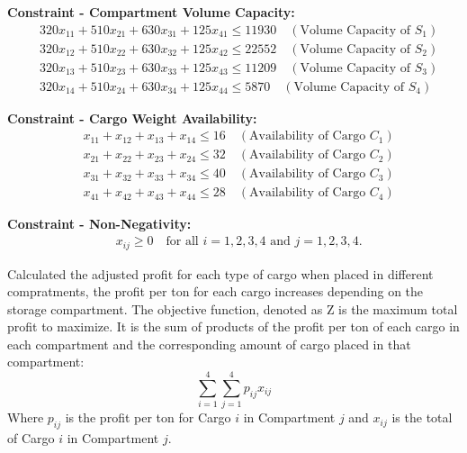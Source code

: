 \documentclass[unicode,11pt,a4paper,oneside,numbers=endperiod,openany]{scrartcl}
\begin{document}
\textbf{Constraint - Compartment Volume Capacity:}
\[
\begin{aligned}
& 320x_{11} + 510x_{21} + 630x_{31} + 125x_{41} \leq 11930 \quad (\text{Volume Capacity of } S_1) \\
& 320x_{12} + 510x_{22} + 630x_{32} + 125x_{42} \leq 22552 \quad (\text{Volume Capacity of } S_2) \\
& 320x_{13} + 510x_{23} + 630x_{33} + 125x_{43} \leq 11209 \quad (\text{Volume Capacity of } S_3) \\
& 320x_{14} + 510x_{24} + 630x_{34} + 125x_{44} \leq 5870  \quad (\text{Volume Capacity of } S_4)
\end{aligned}
\]

\textbf{Constraint - Cargo Weight Availability:}
\[
\begin{aligned}
& x_{11} + x_{12} + x_{13} + x_{14} \leq 16 \quad (\text{Availability of Cargo } C_1) \\
& x_{21} + x_{22} + x_{23} + x_{24} \leq 32 \quad (\text{Availability of Cargo } C_2) \\
& x_{31} + x_{32} + x_{33} + x_{34} \leq 40 \quad (\text{Availability of Cargo } C_3) \\
& x_{41} + x_{42} + x_{43} + x_{44} \leq 28 \quad (\text{Availability of Cargo } C_4)
\end{aligned}
\]

\textbf{Constraint - Non-Negativity:}
\[
\begin{aligned}
& x_{ij} \geq 0 \quad \text{for all } i = 1, 2, 3, 4 \text{ and } j = 1, 2, 3, 4.
\end{aligned}
\]



Calculated the adjusted profit for each type of cargo when placed in different compratments, the profit per ton for each cargo increases depending on the storage compartment.
\newline
The objective function, denoted as Z is the maximum total profit to maximize. It is the sum of products of the profit per ton of each cargo in each compartment and the corresponding amount of cargo placed in that compartment: \[
\sum_{i=1}^{4}\sum_{j=1}^{4} p_{ij}x_{ij}                                                                                                                                                                                                                                  \]
Where $p_{ij}$ is the profit per ton for Cargo $i$ in Compartment $j$ and $x_{ij}$ is the total of Cargo $i$ in Compartment $j$.
\end{document}
